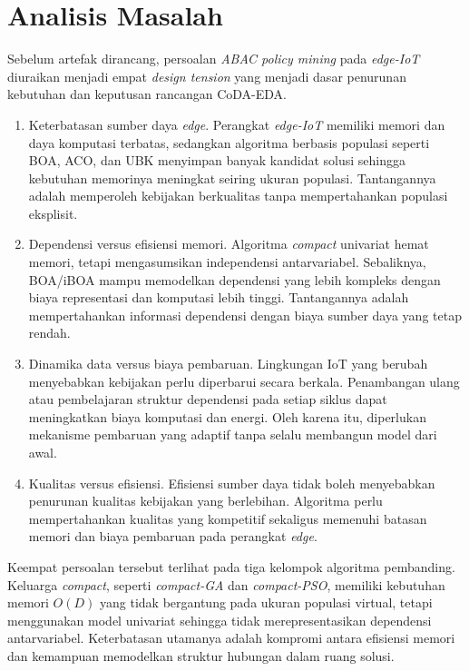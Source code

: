 \section{Analisis Masalah}

Sebelum artefak dirancang, persoalan \textit{ABAC policy mining} pada \textit{edge-IoT} diuraikan menjadi empat \textit{design tension} yang menjadi dasar penurunan kebutuhan dan keputusan rancangan CoDA-EDA.

\begin{enumerate}
    \item Keterbatasan sumber daya \textit{edge}. Perangkat \textit{edge-IoT} memiliki memori dan daya komputasi terbatas, sedangkan algoritma berbasis populasi seperti BOA, ACO, dan UBK menyimpan banyak kandidat solusi sehingga kebutuhan memorinya meningkat seiring ukuran populasi. Tantangannya adalah memperoleh kebijakan berkualitas tanpa mempertahankan populasi eksplisit.
    \item Dependensi versus efisiensi memori. Algoritma \textit{compact} univariat hemat memori, tetapi mengasumsikan independensi antarvariabel. Sebaliknya, BOA/iBOA mampu memodelkan dependensi yang lebih kompleks dengan biaya representasi dan komputasi lebih tinggi. Tantangannya adalah mempertahankan informasi dependensi dengan biaya sumber daya yang tetap rendah.
    \item Dinamika data versus biaya pembaruan. Lingkungan IoT yang berubah menyebabkan kebijakan perlu diperbarui secara berkala. Penambangan ulang atau pembelajaran struktur dependensi pada setiap siklus dapat meningkatkan biaya komputasi dan energi. Oleh karena itu, diperlukan mekanisme pembaruan yang adaptif tanpa selalu membangun model dari awal.
    \item Kualitas versus efisiensi. Efisiensi sumber daya tidak boleh menyebabkan penurunan kualitas kebijakan yang berlebihan. Algoritma perlu mempertahankan kualitas yang kompetitif sekaligus memenuhi batasan memori dan biaya pembaruan pada perangkat \textit{edge}. 
\end{enumerate}

Keempat persoalan tersebut terlihat pada tiga kelompok algoritma pembanding. 
Keluarga \textit{compact}, seperti \textit{compact-GA} dan \textit{compact-PSO}, memiliki kebutuhan memori $O(D)$ yang tidak bergantung pada ukuran populasi virtual, tetapi menggunakan model univariat sehingga tidak merepresentasikan dependensi antarvariabel. 
Keterbatasan utamanya adalah kompromi antara efisiensi memori dan kemampuan memodelkan struktur hubungan dalam ruang solusi.

